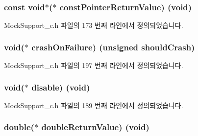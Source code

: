 \subsubsection[{\texorpdfstring{const\+Pointer\+Return\+Value}{constPointerReturnValue}}]{\setlength{\rightskip}{0pt plus 5cm}const void$\ast$($\ast$ const\+Pointer\+Return\+Value) (void)}\hypertarget{struct_s_mock_support__c_a1794c81a61ac14c7be1f2acfd000611f}{}\label{struct_s_mock_support__c_a1794c81a61ac14c7be1f2acfd000611f}


Mock\+Support\+\_\+c.\+h 파일의 173 번째 라인에서 정의되었습니다.

\subsubsection[{\texorpdfstring{crash\+On\+Failure}{crashOnFailure}}]{\setlength{\rightskip}{0pt plus 5cm}void($\ast$ crash\+On\+Failure) (unsigned should\+Crash)}\hypertarget{struct_s_mock_support__c_a790f0afd45339ca921b86ae52f36429f}{}\label{struct_s_mock_support__c_a790f0afd45339ca921b86ae52f36429f}


Mock\+Support\+\_\+c.\+h 파일의 197 번째 라인에서 정의되었습니다.

\subsubsection[{\texorpdfstring{disable}{disable}}]{\setlength{\rightskip}{0pt plus 5cm}void($\ast$ disable) (void)}\hypertarget{struct_s_mock_support__c_ace1449d367bdcce8d6ca549dceac7a7f}{}\label{struct_s_mock_support__c_ace1449d367bdcce8d6ca549dceac7a7f}


Mock\+Support\+\_\+c.\+h 파일의 189 번째 라인에서 정의되었습니다.

\subsubsection[{\texorpdfstring{double\+Return\+Value}{doubleReturnValue}}]{\setlength{\rightskip}{0pt plus 5cm}double($\ast$ double\+Return\+Value) (void)}\hypertarget{struct_s_mock_support__c_a7ecb3db593fac63b35159a89a7dfeed2}{}\label{struct_s_mock_support__c_a7ecb3db593fac63b35159a89a7dfeed2}



